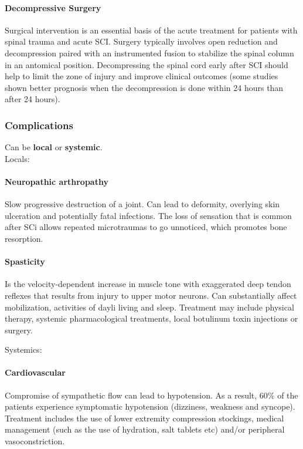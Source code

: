 \documentclass[12pt,article,oneside,a4paper]{memoir}
\begin{document}
\paragraph{Decompressive Surgery}
Surgical intervention is an essential basis of the acute treatment for patients
with spinal trauma and acute SCI. Surgery typically involves open reduction and
decompression paired with an instrumented fusion to stabilize the spinal column
in an antomical position. Decompressing the spinal cord early after SCI should
help to limit the zone of injury and improve clinical outcomes (some studies
shown better prognosis when the decompression is done within 24 hours than
after 24 hours).

\subsubsection{Complications}
Can be \textbf{local} or \textbf{systemic}. \\

Locals:
\paragraph{Neuropathic arthropathy}
Slow progressive destruction of a joint. Can lead to deformity, overlying skin
ulceration and potentially fatal infections. The loss of sensation that is
common after SCi allows repeated microtraumas to go unnoticed, which promotes
bone resorption.

\paragraph{Spasticity}
Is the velocity-dependent increase in muscle tone with exaggerated deep tendon
reflexes that results from injury to upper motor neurons. Can substantially
affect mobilization, activities of dayli living and sleep. Treatment may
include physical therapy, systemic pharmacological treatments, local botulinum
toxin injections or surgery.

Systemics:
\paragraph{Cardiovascular}
Compromise of sympathetic flow can lead to hypotension. As a result, 60\% of
the patients experience symptomatic hypotension (dizziness, weakness and
syncope).
Treatment includes the use of lower extremity compression stockings, medical
management (such as the use of hydration, salt tablets etc) and/or peripheral
vasoconstriction.
\end{document}
